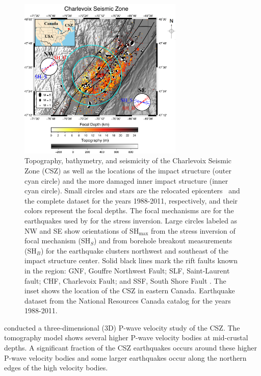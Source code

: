 \documentclass[draft]{agujournal2018}
\begin{document}
\begin{figure}[h]
\centering
\includegraphics[width=18.5pc]{Figures/Map_of_CSZ_2.png} 
\caption{Topography, bathymetry, and seismicity of the Charlevoix Seismic Zone (CSZ) as well as the locations of the impact structure (outer cyan circle) and the more damaged inner impact structure (inner cyan circle). Small circles and stars are the relocated epicenters~\citep{Powell_2017} and the complete dataset for the years 1988-2011, respectively, and their colors represent the focal depths. The focal mechanisms are for the earthquakes used by \citet{Mazzotti_2010} for the stress inversion. Large circles labeled as NW and SE show orientations of SH$_{\max}$ from the stress inversion of focal mechanism (SH$_S$) and from borehole breakout measurements (SH$_B$) for the earthquake clusters northwest and southeast of the impact structure center. Solid black lines mark the rift faults known in the region: GNF, Gouffre Northwest Fault; SLF, Saint-Laurent fault; CHF, Charlevoix Fault; and SSF, South Shore Fault \citep{Rondot_1971,lamontagne1999}. The inset shows the location of the CSZ in eastern Canada. Earthquake dataset from the National Resources Canada catalog for the years 1988-2011.}
\label{figone}
\end{figure}

\citet{Vlahovic_2003} conducted a three-dimensional (3D) P-wave velocity study of the CSZ. The tomography model shows several higher P-wave velocity bodies at mid-crustal depths. A significant fraction of the CSZ earthquakes occurs around these higher P-wave velocity bodies and some larger earthquakes occur along the northern edges of the high velocity bodies. 
\end{document}
